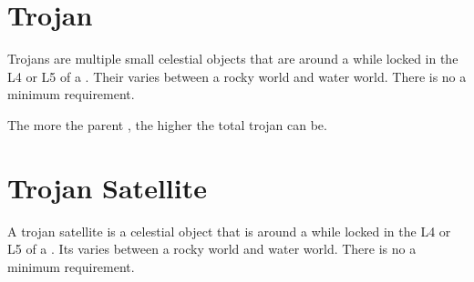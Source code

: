 \documentclass[letterpaper,10pt,english]{sphinxmanual}
\begin{document}
\section{Trojan}
\label{\detokenize{celestial_bodies/trojan:trojan}}\label{\detokenize{celestial_bodies/trojan::doc}}\label{\detokenize{celestial_bodies/trojan:id1}}
\sphinxAtStartPar
Trojans are multiple small celestial objects that are {\hyperref[\detokenize{quantities/orbital/orbital:id1}]{}} around a {\hyperref[\detokenize{celestial_bodies/star:id1}]{}}
while locked in the L4 or L5 {\hyperref[\detokenize{quantities/orbital/lagrange_position:id1}]{}} of a {\hyperref[\detokenize{celestial_bodies/planet:id1}]{}}.
Their {\hyperref[\detokenize{quantities/material/composition_type:id1}]{}}
varies between a rocky world and water world.
There is no a minimum {\hyperref[\detokenize{quantities/material/mass:id1}]{}} requirement.

\sphinxAtStartPar
The more {\hyperref[\detokenize{quantities/material/mass:id1}]{}} the parent {\hyperref[\detokenize{celestial_bodies/planet:id1}]{}},
the higher the total {\hyperref[\detokenize{quantities/material/mass:id1}]{}} trojan can be.


\section{Trojan Satellite}
\label{\detokenize{celestial_bodies/trojan_satellite:trojan-satellite}}\label{\detokenize{celestial_bodies/trojan_satellite::doc}}\label{\detokenize{celestial_bodies/trojan_satellite:id1}}
\sphinxAtStartPar
A trojan satellite is a celestial object that is {\hyperref[\detokenize{quantities/orbital/orbital:id1}]{}} around a {\hyperref[\detokenize{celestial_bodies/star:id1}]{}}
while locked in the L4 or L5 {\hyperref[\detokenize{quantities/orbital/lagrange_position:id1}]{}} of a {\hyperref[\detokenize{celestial_bodies/planet:id1}]{}}.
Its {\hyperref[\detokenize{quantities/material/composition_type:id1}]{}}
varies between a rocky world and water world.
There is no a minimum {\hyperref[\detokenize{quantities/material/mass:id1}]{}} requirement.
\end{document}
